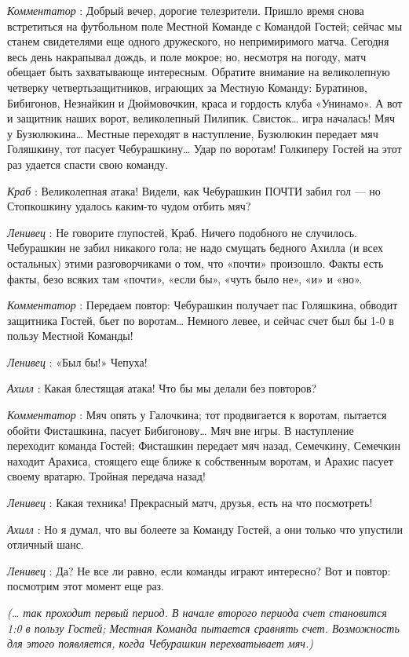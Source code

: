 \emph{Комментатор} : Добрый вечер, дорогие телезрители. Пришло время снова встретиться на футбольном поле Местной Команде с Командой Гостей; сейчас мы станем свидетелями еще одного дружеского, но непримиримого матча. Сегодня весь день накрапывал дождь, и поле мокрое; но, несмотря на погоду, матч обещает быть захватывающе интересным. Обратите внимание на великолепную четверку четвертьзащитников, играющих за Местную Команду: Буратинов, Бибигонов, Незнайкин и Дюймовочкин, краса и гордость клуба «Унинамо». А вот и защитник наших ворот, великолепный Пилипик. Свисток\ldots{} игра началась! Мяч у Бузюлюкина\ldots{} Местные переходят в наступление, Бузюлюкин передает мяч Голяшкину, тот пасует Чебурашкину\ldots{} Удар по воротам! Голкиперу Гостей на этот раз удается спасти свою команду.

\emph{Краб} : Великолепная атака! Видели, как Чебурашкин ПОЧТИ забил гол --- но Стопкошкину удалось каким-то чудом отбить мяч?

\emph{Ленивец} : Не говорите глупостей, Краб. Ничего подобного не случилось. Чебурашкин не забил никакого гола; не надо смущать бедного Ахилла (и всех остальных) этими разговорчиками о том, что «почти» произошло. Факты есть факты, безо всяких там «почти», «если бы», «чуть было не», «и» и «но».

\emph{Комментатор} : Передаем повтор: Чебурашкин получает пас Голяшкина, обводит защитника Гостей, бьет по воротам\ldots{} Немного левее, и сейчас счет был бы 1-0 в пользу Местной Команды!

\emph{Ленивец} : «Был бы!» Чепуха!

\emph{Ахилл} : Какая блестящая атака! Что бы мы делали без повторов?

\emph{Комментатор} : Мяч опять у Галочкина; тот продвигается к воротам, пытается обойти Фисташкина, пасует Бибигонову\ldots{} Мяч вне игры. В наступление переходит команда Гостей; Фисташкин передает мяч назад, Семечкину, Семечкин находит Арахиса, стоящего еще ближе к собственным воротам, и Арахис пасует своему вратарю. Тройная передача назад!

\emph{Ленивец} : Какая техника! Прекрасный матч, друзья, есть на что посмотреть!

\emph{Ахилл} : Но я думал, что вы болеете за Команду Гостей, а они только что упустили отличный шанс.

\emph{Ленивец} : Да? Не все ли равно, если команды играют интересно? Вот и повтор: посмотрим этот момент еще раз.

\emph{(\ldots{} так проходит первый период. В начале второго периода счет становится 1:0 в пользу Гостей; Местная Команда пытается сравнять счет. Возможность для этого появляется, когда Чебурашкин перехватывает мяч.)}

